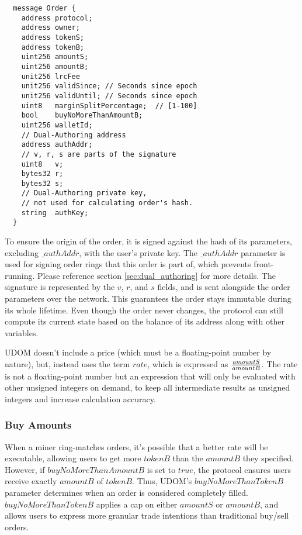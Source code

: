 \documentclass[UTF8,nofonts]{article}
\begin{document}
\begin{multicols}{2}
\begin{verbatim}
  message Order {
    address protocol;
    address owner;
    address tokenS;
    address tokenB;
    uint256 amountS;
    uint256 amountB;
    unit256 lrcFee
    unit256 validSince; // Seconds since epoch
    unit256 validUntil; // Seconds since epoch
    uint8   marginSplitPercentage;  // [1-100]
    bool    buyNoMoreThanAmountB;
    uint256 walletId;
    // Dual-Authoring address
    address authAddr;
   	// v, r, s are parts of the signature
    uint8   v;       
    bytes32 r;
    bytes32 s;
    // Dual-Authoring private key,
    // not used for calculating order's hash.
    string  authKey;          
  }
\end{verbatim}
To ensure the origin of the order, it is signed against the hash of its parameters, excluding $\_authAddr$, with the user's private key. The $\_authAddr$ parameter is used for signing  order rings that this order is part of, which prevents front-running. Please reference section \ref{sec:dual_authoring} for more details. The signature is represented by the $v$, $r$, and $s$ fields, and is sent alongside the order parameters over the network. This guarantees the order stays immutable during its whole lifetime. Even though the order never changes, the protocol can still compute its current state based on the balance of its address along with other variables.


UDOM doesn't include a price (which must be a floating-point number by nature), but, instead uses the term $rate$, which is expressed as $amountS \over amountB$. The rate is not a floating-point number but an expression that will only be evaluated with other unsigned integers on demand, to keep all intermediate results as unsigned integers and increase calculation accuracy. 

\subsubsection{Buy Amounts}
When a miner ring-matches orders, it's possible that a better rate will be executable, allowing users to get more $tokenB$ than the $amountB$ they specified. However, if $buyNoMoreThanAmountB$ is set to $true$, the protocol ensures users receive exactly $amountB$ of $tokenB$. Thus, UDOM's $buyNoMoreThanTokenB$ parameter determines when an order is considered completely filled. $buyNoMoreThanTokenB$ applies a cap on either $amountS$ or $amountB$, and allows users to express more granular trade intentions than traditional buy/sell orders.


\end{multicols}
\end{document}
